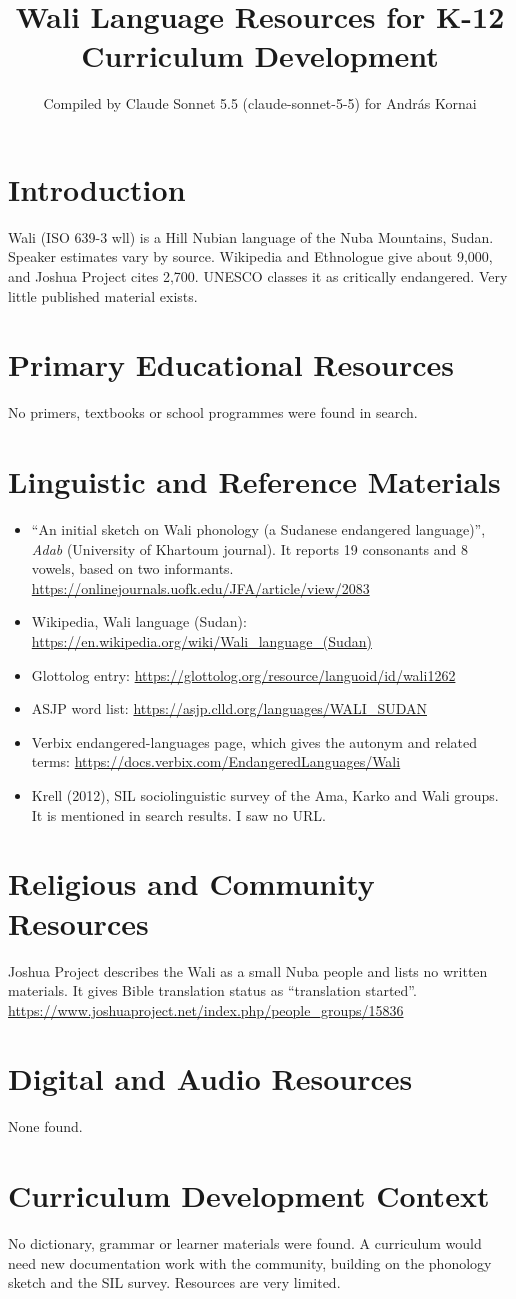 \documentclass[12pt]{article}
\title{Wali Language Resources for K-12 Curriculum Development}
\author{Compiled by Claude Sonnet 5.5 (claude-sonnet-5-5) for Andr\'as Kornai}
\date{}
\begin{document}
\maketitle

\section{Introduction}
Wali (ISO 639-3 wll) is a Hill Nubian language of the Nuba Mountains, Sudan. Speaker estimates vary by source. Wikipedia and Ethnologue give about 9,000, and Joshua Project cites 2,700. UNESCO classes it as critically endangered. Very little published material exists.

\section{Primary Educational Resources}
No primers, textbooks or school programmes were found in search.

\section{Linguistic and Reference Materials}
\begin{itemize}
\item ``An initial sketch on Wali phonology (a Sudanese endangered language)'', \emph{Adab} (University of Khartoum journal). It reports 19 consonants and 8 vowels, based on two informants. \url{https://onlinejournals.uofk.edu/JFA/article/view/2083}
\item Wikipedia, Wali language (Sudan): \url{https://en.wikipedia.org/wiki/Wali_language_(Sudan)}
\item Glottolog entry: \url{https://glottolog.org/resource/languoid/id/wali1262}
\item ASJP word list: \url{https://asjp.clld.org/languages/WALI_SUDAN}
\item Verbix endangered-languages page, which gives the autonym and related terms: \url{https://docs.verbix.com/EndangeredLanguages/Wali}
\item Krell (2012), SIL sociolinguistic survey of the Ama, Karko and Wali groups. It is mentioned in search results. I saw no URL.
\end{itemize}

\section{Religious and Community Resources}
Joshua Project describes the Wali as a small Nuba people and lists no written materials. It gives Bible translation status as ``translation started''. \url{https://www.joshuaproject.net/index.php/people_groups/15836}

\section{Digital and Audio Resources}
None found.

\section{Curriculum Development Context}
No dictionary, grammar or learner materials were found. A curriculum would need new documentation work with the community, building on the phonology sketch and the SIL survey. Resources are very limited.
\end{document}
